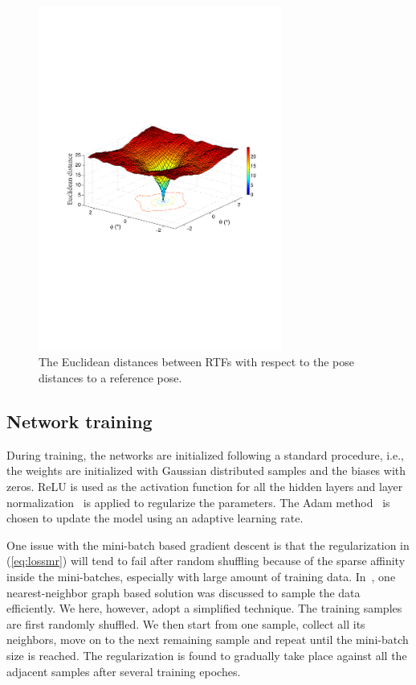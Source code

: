 \documentclass{article}
\begin{document}
\begin{figure}[tb]
    \centering
    \centerline{\includegraphics[width=8.0cm]{fig2_euc.pdf}}
    \caption{The Euclidean distances between RTFs with respect to the pose distances to a reference pose.}
    \label{fig2}
\end{figure}

\subsection{Network training}

During training, the networks are initialized following a standard procedure, i.e., the weights are initialized with Gaussian distributed samples and the biases with zeros. ReLU is used as the activation function for all the hidden layers and layer normalization~\cite{ba2016layer} is applied to regularize the parameters. The Adam method~\cite{kingma2014adam} is chosen to update the model using an adaptive learning rate.

One issue with the mini-batch based gradient descent is that the regularization in (\ref{eq:lossmr}) will tend to fail after random shuffling because of the sparse affinity inside the mini-batches, especially with large amount of training data. In~\cite{th2017acoustic}, one nearest-neighbor graph based solution was discussed to sample the data efficiently. We here, however, adopt a simplified technique. The training samples are first randomly shuffled. We then start from one sample, collect all its neighbors, move on to the next remaining sample and repeat until the mini-batch size is reached. The regularization is found to gradually take place against all the adjacent samples after several training epoches.
\end{document}
